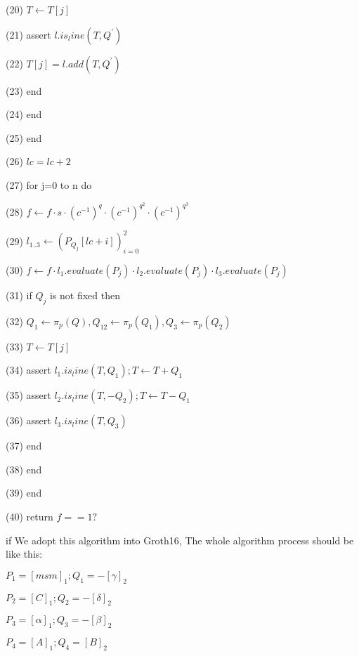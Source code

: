 (20) \indent \indent \indent $\displaystyle T \leftarrow T[j] $ 

(21) \indent \indent \indent assert $\displaystyle l.is_line(T, Q^{'}) $ 

(22) \indent \indent \indent $\displaystyle T[j] = l.add(T, Q^{'}) $ 

(23) \indent \indent \indent end 

(24) \indent \indent end 

(25) \indent end 

(26) \indent $\displaystyle lc = lc + 2 $ 

(27) \indent for j=0 to n do 

(28) \indent \indent $\displaystyle f \leftarrow f \cdot s \cdot (c^{-1})^q \cdot (c^{-1})^{q^2} \cdot (c^{-1})^{q^3} $ 

(29) \indent \indent $\displaystyle l_{1..3} \leftarrow (P_{Q_j}[lc+i])_{i=0}^2 $ 

(30) \indent \indent $\displaystyle f \leftarrow f \cdot l_1.evaluate(P_{j}) \cdot l_2.evaluate(P_{j}) \cdot l_3.evaluate(P_{j}) $ 

(31) \indent \indent if $Q_j$ is not fixed then 

(32) \indent \indent \indent $\displaystyle Q_1 \leftarrow \pi_p(Q), Q_12\leftarrow \pi_p(Q_1), Q_3 \leftarrow \pi_p(Q_2) $ 

(33) \indent \indent \indent $\displaystyle T \leftarrow T[j] $ 

(34) \indent \indent \indent assert $\displaystyle l_1.is_line(T, Q_1); T \leftarrow T + Q_1 $ 

(35) \indent \indent \indent assert $\displaystyle l_2.is_line(T, -Q_2); T \leftarrow T - Q_1 $ 

(36) \indent \indent \indent assert $\displaystyle l_3.is_line(T, Q_3) $ 

(37) \indent \indent end 

(38) \indent end 

(39) end 

(40) return $\displaystyle f == 1? $ 


if We adopt this algorithm into Groth16, The whole algorithm process should be like this:

$\displaystyle P_1 = [msm]_1; Q_1 = -[\gamma]_2 $

$\displaystyle P_2 = [C]_1; Q_2 = -[\delta]_2 $

$\displaystyle P_3 = [\alpha]_1; Q_3 = -[\beta]_2 $

$\displaystyle P_4 = [A]_1; Q_4 = [B]_2 $



